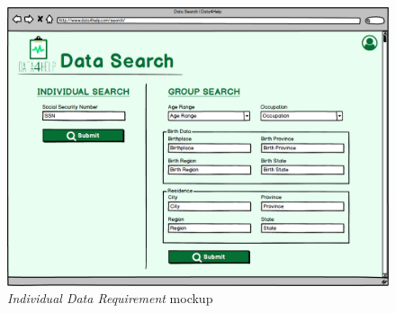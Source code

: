 \begin{figure}
\begin{center}
  \includegraphics[width=\textwidth]{img/mockup/Data_Search.png}
  \hspace{0.05\linewidth}
  \centering
  \caption{\textit{Individual Data Requirement} mockup}
  \label{img:individualDataRequirementMockup}
\end{center}
\end{figure}
